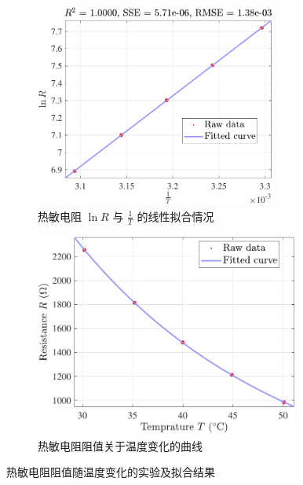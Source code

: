 \documentclass[UTF8]{article}
\theoremstyle{MyLineTheoremStyle} %
\theoremstyle{MyBlockTheoremStyle} %
\theoremstyle{MySubsubsectionStyle} %
\begin{document}
\begin{figure}[H]\centering
\begin{subfigure}[b]{0.47\columnwidth}\centering
    \includegraphics[height=190pt]{assets/热敏电阻.pdf}
    \caption{热敏电阻 $\ln R$ 与 $\frac{1}{T}$ 的线性拟合情况}
\end{subfigure}\hfill
\begin{subfigure}[b]{0.51\columnwidth}\centering
    \includegraphics[height=190pt]{assets/热敏电阻 2.pdf}
    \caption{热敏电阻阻值关于温度变化的曲线}
\end{subfigure}
\caption{热敏电阻阻值随温度变化的实验及拟合结果}
\label{热敏电阻阻值随温度变化}
\end{figure}
\end{document}

